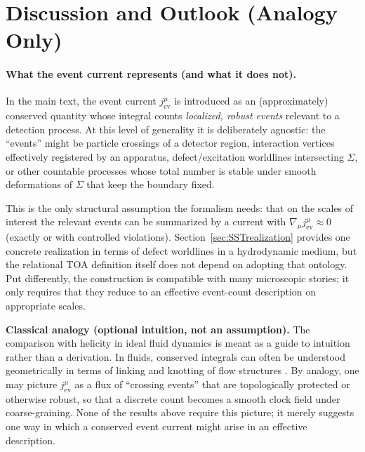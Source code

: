 \documentclass[pdflatex,sn-mathphys-num]{sn-jnl}
\theoremstyle{thmstylethree}
\theoremstyle{thmstyleone}
\theoremstyle{thmstyletwo}
\numberwithin{equation}{section}
\begin{document}
    \section{Discussion and Outlook (Analogy Only)}
    
    \paragraph{What the event current represents (and what it does not).}
        In the main text, the event current $j^\mu_{\mathrm{ev}}$ is introduced as an (approximately) conserved quantity whose integral counts \emph{localized, robust events} relevant to a detection process. At this level of generality it is deliberately agnostic: the ``events'' might be particle crossings of a detector region, interaction vertices effectively registered by an apparatus, defect/excitation worldlines intersecting $\Sigma$, or other countable processes whose total number is stable under smooth deformations of $\Sigma$ that keep the boundary fixed.
        
        This is the only structural assumption the formalism needs: that on the scales of interest the relevant events can be summarized by a current with $\nabla_\mu j^\mu_{\mathrm{ev}}\approx 0$ (exactly or with controlled violations). Section~\ref{sec:SSTrealization} provides one concrete realization in terms of defect worldlines in a hydrodynamic medium, but the relational TOA definition itself does not depend on adopting that ontology. Put differently, the construction is compatible with many microscopic stories; it only requires that they reduce to an effective event-count description on appropriate scales.
        
        \medskip
        \noindent
        \textbf{Classical analogy (optional intuition, not an assumption).}
        The comparison with helicity in ideal fluid dynamics is meant as a guide to intuition rather than a derivation. In fluids, conserved integrals can often be understood geometrically in terms of linking and knotting of flow structures \cite{Moffatt1969Helicity,ArnoldKhesin1998,Saffman1992}. By analogy, one may picture $j^\mu_{\mathrm{ev}}$ as a flux of ``crossing events'' that are topologically protected or otherwise robust, so that a discrete count becomes a smooth clock field under coarse-graining. None of the results above require this picture; it merely suggests one way in which a conserved event current might arise in an effective description.
        
\end{document}
